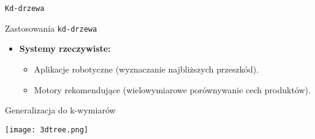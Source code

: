 \documentclass[aspectratio=1610, polish]{beamer}
\begin{document}
\begin{section}{\texttt{Kd-drzewa}}
\begin{frame}{Zastosowania \texttt{kd-drzewa}}
\begin{itemize}
        \item \textbf{Systemy rzeczywiste:}
        \begin{itemize}
            \item Aplikacje robotyczne (wyznaczanie najbliższych przeszkód).
            \item Motory rekomendujące (wielowymiarowe porównywanie cech produktów).
        \end{itemize}
    \end{itemize}
\end{frame}
\begin{frame}{Generalizacja do k-wymiarów}
\begin{center}
    \texttt{[image: 3dtree.png]}
\end{center}
\end{frame}
\end{section}
\end{document}
